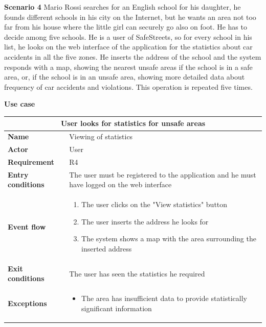 \begin{description}
    \item \textbf{Scenario 4} \newline
        Mario Rossi searches for an English school for his daughter, he founds different schools in his city on the Internet, but he wants an area 
        not too far from his house where the little girl can securely go also on foot. He has to decide among five schools. He is a user of SafeStreets, so 
        for every school in his list, he looks on the web interface of the application for the statistics about car accidents in all the five zones. He inserts the address of the school and the system responds with a map, showing the nearest unsafe areas if the school is in a safe area, or, if the school is in an unsafe 
        area, showing more detailed data about frequency of car accidents and violations. This operation is repeated five times.

    \item \textbf{Use case}
        \begin{center}
            \begin{tabular}{|p{3cm}|p{7cm}|}
                \multicolumn{2}{c}{\textbf{User looks for statistics for unsafe areas}} \\
                \hline
                \textbf{Name} & Viewing of statistics \\
                \hline
                \textbf{Actor} & User \\
                \hline
                \textbf{Requirement} & R4 \\
                \hline
                \textbf{Entry conditions} & The user must be registered to the application and he must have logged on the web interface\\
                \hline
                \textbf{Event flow} &
                \begin{enumerate}
                    \item The user clicks on the "View statistics" button
                    \item The user inserts the address he looks for
                    \item The system shows a map with the area surrounding the inserted address
                \end{enumerate} \\
                \hline
                \textbf{Exit conditions} & The user has seen the statistics he required \\
                \hline
                \textbf{Exceptions}
                & \begin{itemize}
                    \item The area has insufficient data to provide statistically significant information
                \end{itemize} \\
                \hline
            \end{tabular}
        \end{center}
\end{description}

